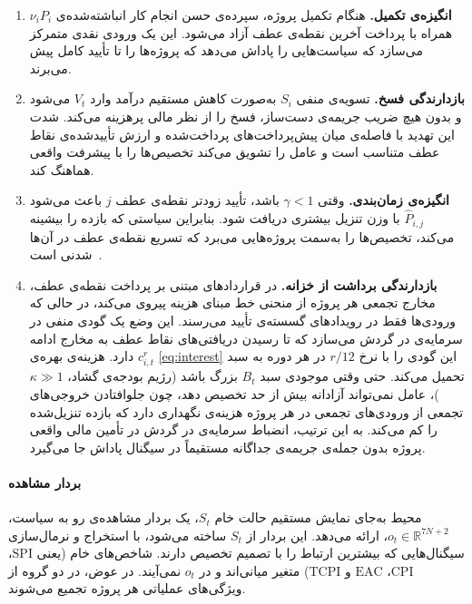 \begin{enumerate}[label=(\roman*)]
  \item \textbf{انگیزه‌ی تکمیل.} هنگام تکمیل پروژه، سپرده‌ی حسن انجام
    کار انباشته‌شده‌ی $\nu_i P_i$ همراه با پرداخت آخرین نقطه‌ی عطف
    آزاد می‌شود. این یک ورودی نقدی متمرکز می‌سازد که سیاست‌هایی را
    پاداش می‌دهد که پروژه‌ها را تا تأیید کامل پیش می‌برند.

  \item \textbf{بازدارندگی فسخ.} تسویه‌ی منفی $S_i$ به‌صورت کاهش مستقیم
    درآمد وارد $V_t$ می‌شود و بدون هیچ ضریب جریمه‌ی دست‌ساز، فسخ را
    از نظر مالی پرهزینه می‌کند. شدت این تهدید با فاصله‌ی میان
    پیش‌پرداخت‌های پرداخت‌شده و ارزش تأییدشده‌ی نقاط عطف متناسب است
    و عامل را تشویق می‌کند تخصیص‌ها را با پیشرفت واقعی هماهنگ کند.

  \item \textbf{انگیزه‌ی زمان‌بندی.} وقتی $\gamma < 1$ باشد، تأیید زودتر
    نقطه‌ی عطف $j$ باعث می‌شود $\hat{P}_{i,j}$ با وزن تنزیل بیشتری
    دریافت شود. بنابراین سیاستی که بازده را بیشینه می‌کند، تخصیص‌ها را
    به‌سمت پروژه‌هایی می‌برد که تسریع نقطه‌ی عطف در آن‌ها شدنی
    است~\citep{Damodaran2012}.

  \item \textbf{بازدارندگی برداشت از خزانه.} در قراردادهای مبتنی بر
    پرداخت نقطه‌ی عطف، مخارج تجمعی هر پروژه از منحنی  خط مبنای
    هزینه پیروی می‌کند، در حالی که ورودی‌ها فقط در رویدادهای گسسته‌ی
    تأیید می‌رسند. این وضع یک گودی منفی در سرمایه‌ی در گردش می‌سازد که
    تا رسیدن دریافتی‌های نقاط عطف به مخارج ادامه دارد. هزینه‌ی بهره‌ی
    $c^r_{i,t}$ \eqref{eq:interest} این گودی را با نرخ $r/12$ در هر
    دوره به سبد تحمیل می‌کند. حتی وقتی موجودی سبد $B_t$ بزرگ باشد
    (رژیم بودجه‌ی گشاد، $\kappa \gg 1$)، عامل نمی‌تواند آزادانه بیش از
    حد تخصیص دهد، چون جلوافتادن خروجی‌های تجمعی از ورودی‌های تجمعی در
    هر پروژه هزینه‌ی نگهداری دارد که بازده تنزیل‌شده را کم می‌کند.
    به این ترتیب، انضباط سرمایه‌ی در گردش در تأمین مالی واقعی پروژه
    بدون جمله‌ی جریمه‌ی جداگانه مستقیماً در سیگنال پاداش جا می‌گیرد.
\end{enumerate}

\paragraph{بردار مشاهده}
\label{subsubsec:obs}

محیط به‌جای نمایش مستقیم حالت خام $S_t$، یک بردار مشاهده‌ی رو به
سیاست، $o_t \in \mathbb{R}^{7N+2}$، ارائه می‌دهد. این بردار از $S_t$
ساخته می‌شود، با استخراج و نرمال‌سازی سیگنال‌هایی که بیشترین ارتباط
را با تصمیم تخصیص دارند. شاخص‌های خام  (یعنی $\mathrm{SPI}$،
$\mathrm{CPI}$، $\mathrm{EAC}$ و $\mathrm{TCPI}$) متغیر میانی‌اند و در
$o_t$ نمی‌آیند. در عوض، در دو گروه از ویژگی‌های عملیاتی هر پروژه
تجمیع می‌شوند.

